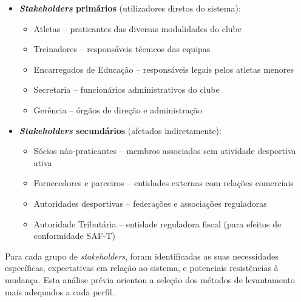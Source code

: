 \documentclass[a4paper,12pt]{scrreprt}
\begin{document}
\begin{itemize}
    \item \textbf{\textit{Stakeholders} primários} (utilizadores diretos do sistema):
    \begin{itemize}
        \item Atletas -- praticantes das diversas modalidades do clube
        \item Treinadores -- responsáveis técnicos das equipas
        \item Encarregados de Educação -- responsáveis legais pelos atletas menores
        \item Secretaria -- funcionários administrativos do clube
        \item Gerência -- órgãos de direção e administração
    \end{itemize}

    \item \textbf{\textit{Stakeholders} secundários} (afetados indiretamente):
    \begin{itemize}
        \item Sócios não-praticantes -- membros associados sem atividade desportiva ativa
        \item Fornecedores e parceiros -- entidades externas com relações comerciais
        \item Autoridades desportivas -- federações e associações reguladoras
        \item Autoridade Tributária -- entidade reguladora fiscal (para efeitos de conformidade SAF-T)
    \end{itemize}
\end{itemize}

Para cada grupo de \textit{stakeholders}, foram identificadas as suas necessidades específicas, expectativas em relação ao sistema, e potenciais resistências à mudança. Esta análise prévia orientou a seleção dos métodos de levantamento mais adequados a cada perfil.
\end{document}

